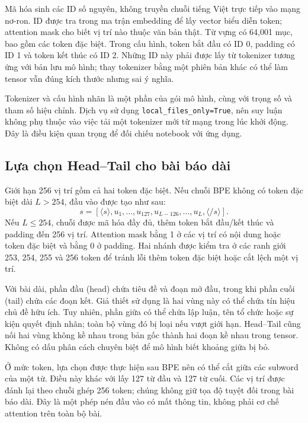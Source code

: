 Mã hóa sinh các ID số nguyên, không truyền chuỗi tiếng Việt trực tiếp vào mạng nơ-ron. ID được tra trong ma trận embedding để lấy vector biểu diễn token; attention mask cho biết vị trí nào thuộc văn bản thật. Từ vựng có 64,001 mục, bao gồm các token đặc biệt. Trong cấu hình, token bắt đầu có ID 0, padding có ID 1 và token kết thúc có ID 2. Những ID này phải được lấy từ tokenizer tương ứng với bản lưu mô hình; thay tokenizer bằng một phiên bản khác có thể làm tensor vẫn đúng kích thước nhưng sai ý nghĩa.

Tokenizer và cấu hình nhãn là một phần của gói mô hình, cùng với trọng số và tham số hiệu chỉnh. Dịch vụ sử dụng \texttt{local\_files\_only=True}, nên suy luận không phụ thuộc vào việc tải một tokenizer mới từ mạng trong lúc khởi động. Đây là điều kiện quan trọng để đối chiếu notebook với ứng dụng.

\subsection{Lựa chọn Head--Tail cho bài báo dài}
Giới hạn 256 vị trí gồm cả hai token đặc biệt. Nếu chuỗi BPE không có token đặc biệt dài $L>254$, đầu vào được tạo như sau:
\begin{equation}
s=[\langle s\rangle,u_1,\ldots,u_{127},u_{L-126},\ldots,u_L,\langle/ s\rangle].
\end{equation}
Nếu $L\le254$, chuỗi được mã hóa đầy đủ, thêm token bắt đầu/kết thúc và padding đến 256 vị trí. Attention mask bằng 1 ở các vị trí có nội dung hoặc token đặc biệt và bằng 0 ở padding. Hai nhánh được kiểm tra ở các ranh giới 253, 254, 255 và 256 token để tránh lỗi thêm token đặc biệt hoặc cắt lệch một vị trí.

\HeadTailDiagram
Với bài dài, phần đầu (head) chứa tiêu đề và đoạn mở đầu, trong khi phần cuối (tail) chứa các đoạn kết. Giả thiết sử dụng là hai vùng này có thể chứa tín hiệu chủ đề hữu ích. Tuy nhiên, phần giữa có thể chứa lập luận, tên tổ chức hoặc sự kiện quyết định nhãn; toàn bộ vùng đó bị loại nếu vượt giới hạn. Head--Tail cũng nối hai vùng không kề nhau trong bản gốc thành hai đoạn kề nhau trong tensor. Không có dấu phân cách chuyên biệt để mô hình biết khoảng giữa bị bỏ.

Ở mức token, lựa chọn được thực hiện sau BPE nên có thể cắt giữa các subword của một từ. Điều này khác với lấy 127 từ đầu và 127 từ cuối. Các vị trí được đánh lại theo chuỗi ghép 256 token; chúng không giữ tọa độ tuyệt đối trong bài báo dài. Đây là một phép nén đầu vào có mất thông tin, không phải cơ chế attention trên toàn bộ bài.

